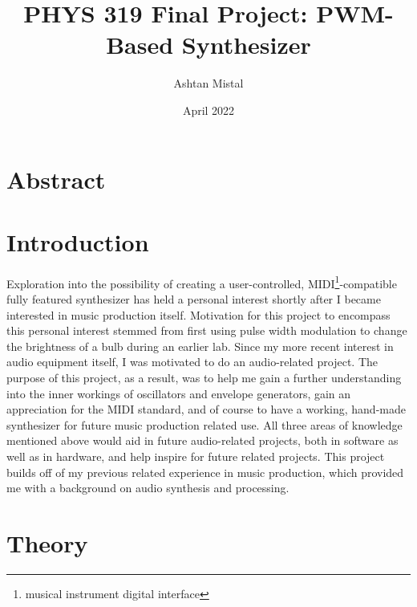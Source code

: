 \documentclass[12pt]{article}
\title{PHYS 319 Final Project: PWM-Based Synthesizer}
\author{Ashtan Mistal}
\date{April 2022}
\begin{document}
\maketitle

\break
\begin{singlespace}
\tableofcontents{}
\end{singlespace}

\break



\section{Abstract}\label{sec:abstract}


\section{Introduction}\label{sec:introduction}

Exploration into the possibility of creating a user-controlled, MIDI\footnote{musical instrument digital interface}-compatible fully featured synthesizer has held a personal interest shortly after I became interested in music production itself.
Motivation for this project to encompass this personal interest stemmed from first using pulse width modulation to change the brightness of a bulb during an earlier lab.
Since my more recent interest in audio equipment itself, I was motivated to do an audio-related project.
The purpose of this project, as a result, was to help me gain a further understanding into the inner workings of oscillators and envelope generators, gain an appreciation for the MIDI standard, and of course to have a working, hand-made synthesizer for future music production related use.
All three areas of knowledge mentioned above would aid in future audio-related projects, both in software as well as in hardware, and help inspire for future related projects.
This project builds off of my previous related experience in music production, which provided me with a background on audio synthesis and processing.

\section{Theory}\label{sec:theory}

\end{document}
